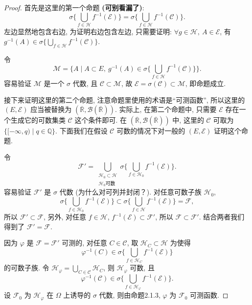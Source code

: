         \begin{proof}
            首先是这里的第一个命题\textbf{ (可别看漏了)}: 
            \[
                \sigma\{\bigcup_{f\in\mathcal{H}}f^{-1}(\mathcal{E})\}=\sigma\{\bigcup_{f\in\mathcal{H}}f^{-1}(\mathcal{C})\}.
            \]
            左边显然地包含右边, 
            为证明右边包含左边, 
            只需要证明: $\forall g\in\mathcal{H},\ A\in\mathcal{E}$, 有 $g^{-1}(A)\in\sigma\{\displaystyle\bigcup_{f\in\mathcal{H}}f^{-1}(\mathcal{C})\}$.

            令\[
                \mathcal{M}=\{A\mid A\subset E,\ g^{-1}(A)\in\sigma\{\bigcup_{f\in\mathcal{H}}f^{-1}(\mathcal{C})\}\}.
            \]
            容易验证 $\mathcal{M}$ 是一个 $\sigma$ 代数, 
            且 $\mathcal{C}\subset\mathcal{M}$, 
            故 $\mathcal{E}=\sigma(\mathcal{C})\subset\mathcal{M}$, 
            即命题成立.

            接下来证明这里的第二个命题, 注意命题里使用的术语是``可测函数'', 
            所以这里的 $(E,\mathcal{E})$ 应当被替换为 $(\overline{\mathbb{R}},\mathcal{B}(\overline{\mathbb{R}}))$. 
            实际上, 
            在第二个命题中, 
            只需要 $\mathcal{E}$ 存在一个生成它的可数集类 $\mathcal{C}$ 这个条件即可. 
            在 $(\overline{\mathbb{R}},\mathcal{B}(\overline{\mathbb{R}}))$ 中, 
            这里的 $\mathcal{C}$ 可取为 $\{[-\infty,q)\mid q\in\mathbb{Q}\}$. 
            下面我们在假设 $\mathcal{C}$ 可数的情况下对一般的 $(E,\mathcal{E})$ 证明这个命题. 

            令
            \[
                \mathcal{F}'=\bigcup_{\substack{\mathcal{H}_0\subset \mathcal{H}\\ \mathcal{H}_0 可数}}\sigma\{\bigcup_{f\in\mathcal{H}_0}f^{-1}(\mathcal{E})\}.
            \]
            容易验证 $\mathcal{F}'$ 是 $\sigma$ 代数 (为什么对可列并封闭？). 
            对任意可数子族 $\mathcal{H}_0$, 
            \[
                \sigma\{\bigcup_{f\in\mathcal{H}_0}f^{-1}(\mathcal{E})\}\subset \sigma\{\bigcup_{f\in\mathcal{H}}f^{-1}(\mathcal{E})\}=\mathcal{F},
            \]
            所以 $\mathcal{F}'\subset\mathcal{F}$, 另外, 对任意 $f\in\mathcal{H}$, $f^{-1}(\mathcal{E})\subset\mathcal{F}'$, 所以 $\mathcal{F}\subset \mathcal{F}'$.
            结合两者我们得到了 $\mathcal{F}'=\mathcal{F}$.

            因为 $\varphi$ 是 $\mathcal{F}=\mathcal{F}'$ 可测的, 
            对任意 $C\in\mathcal{C}$, 取 $\mathcal{H}_C\subset \mathcal{H}$ 为使得
            \[
                \varphi^{-1}(C)\in\sigma\{\bigcup_{f\in\mathcal{H}_C}f^{-1}(\mathcal{E})\}
            \]
            的可数子族. 令 $\mathcal{H}_\varphi=\displaystyle\bigcup_{C\in\mathcal{C}}\mathcal{H}_C$, 
            则 $\mathcal{H}_\varphi$ 可数, 且
            \[
                \varphi^{-1}(\mathcal{C})\in\sigma\{\bigcup_{f\in\mathcal{H}_\varphi}f^{-1}(\mathcal{E})\}.
            \]
            设 $\mathcal{F}_0$ 为 $\mathcal{H}_\varphi$ 在 $\Omega$ 上诱导的 $\sigma$ 代数, 
            则由命题2.1.3, $\varphi$ 为 $\mathcal{F}_0$ 可测函数.

        \end{proof}
